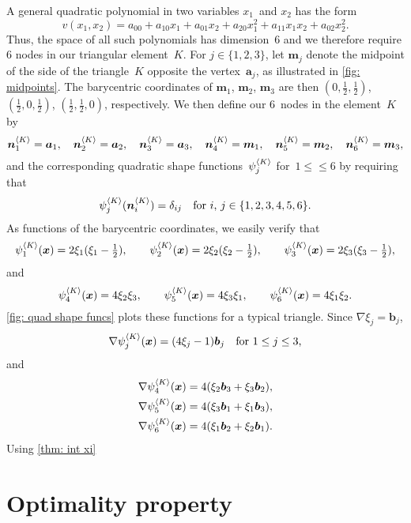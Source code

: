 A general quadratic polynomial in two variables $x_1$~and $x_2$ has the form
\[
v(x_1,x_2)=a_{00}+a_{10}x_1+a_{01}x_2+a_{20}x_1^2+a_{11}x_1x_2+a_{02}x_2^2.
\]
Thus, the space of all such polynomials has dimension~$6$ and we therefore 
require $6$ nodes in our triangular element~$K$. For $j\in\{1,2,3\}$, let 
$\boldsymbol{m}_j$ denote the midpoint of the side of the triangle~$K$ opposite 
the vertex~$\boldsymbol{a}_j$, as illustrated in
\cref{fig: midpoints}.  The barycentric coordinates of $\boldsymbol{m}_1$, 
$\boldsymbol{m}_2$, $\boldsymbol{m}_3$ are then $(0,\tfrac12,\tfrac12)$,
$(\tfrac12,0,\tfrac12)$, $(\tfrac12,\tfrac12,0)$, respectively.  We then define 
our 6~nodes in the element~$K$ by
\[
\boldsymbol{n}^{\langle K\rangle}_1=\boldsymbol{a}_1,\quad
\boldsymbol{n}^{\langle K\rangle}_2=\boldsymbol{a}_2,\quad
\boldsymbol{n}^{\langle K\rangle}_3=\boldsymbol{a}_3,\quad
\boldsymbol{n}^{\langle K\rangle}_4=\boldsymbol{m}_1,\quad
\boldsymbol{n}^{\langle K\rangle}_5=\boldsymbol{m}_2,\quad
\boldsymbol{n}^{\langle K\rangle}_6=\boldsymbol{m}_3,
\]
and the corresponding quadratic shape functions~$\psi^{\langle K\rangle}_j$ 
for~$1\le \le 6$ by requiring that
\[
\psi^{\langle K\rangle}_j(\boldsymbol{n}^{\langle K\rangle}_i)=\delta_{ij}
\quad\text{for $i$, $j\in\{1,2,3,4,5,6\}$.}
\]
As functions of the barycentric coordinates, we easily verify that
\[
\psi^{\langle K\rangle}_1(\boldsymbol{x})=2\xi_1(\xi_1-\tfrac12),\qquad
\psi^{\langle K\rangle}_2(\boldsymbol{x})=2\xi_2(\xi_2-\tfrac12),\qquad
\psi^{\langle K\rangle}_3(\boldsymbol{x})=2\xi_3(\xi_3-\tfrac12),
\]
and
\[
\psi^{\langle K\rangle}_4(\boldsymbol{x})=4\xi_2\xi_3,\qquad
\psi^{\langle K\rangle}_5(\boldsymbol{x})=4\xi_3\xi_1,\qquad
\psi^{\langle K\rangle}_6(\boldsymbol{x})=4\xi_1\xi_2.
\]
\cref{fig: quad shape funcs} plots these functions for a typical triangle.
Since $\nabla\xi_j=\boldsymbol{b}_j$, 
\[
\nabla\psi^{\langle K\rangle}_j(\boldsymbol{x})=(4\xi_j-1)\boldsymbol{b}_j
\quad\text{for $1\le j\le 3$,}
\]
and
\begin{align*}
\nabla\psi^{\langle K\rangle}_4(\boldsymbol{x})
    &=4(\xi_2\boldsymbol{b}_3+\xi_3\boldsymbol{b}_2),\\
\nabla\psi^{\langle K\rangle}_5(\boldsymbol{x})
    &=4(\xi_3\boldsymbol{b}_1+\xi_1\boldsymbol{b}_3),\\
\nabla\psi^{\langle K\rangle}_6(\boldsymbol{x})
    &=4(\xi_1\boldsymbol{b}_2+\xi_2\boldsymbol{b}_1).
\end{align*}
Using \cref{thm: int xi}



\section{Optimality property}


